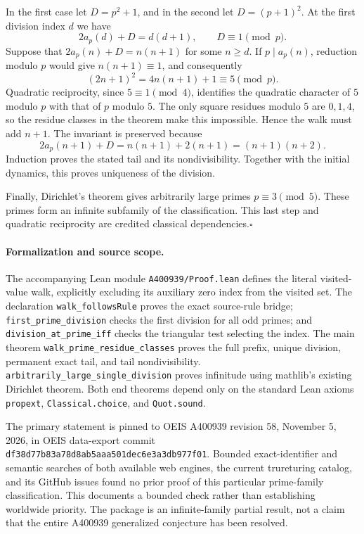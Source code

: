 In the first case let $D=p^2+1$, and in the second let $D=(p+1)^2$.
At the first division index $d$ we have
\[
 2a_p(d)+D=d(d+1),\qquad D\equiv1\pmod p.
\]
Suppose that $2a_p(n)+D=n(n+1)$ for some $n\ge d$. If
$p\mid a_p(n)$, reduction modulo $p$ would give $n(n+1)\equiv1$,
and consequently
\[
 (2n+1)^2=4n(n+1)+1\equiv5\pmod p.
\]
Quadratic reciprocity, since $5\equiv1\pmod4$, identifies the quadratic
character of $5$ modulo $p$ with that of $p$ modulo $5$. The only square
residues modulo $5$ are $0,1,4$, so the residue classes in the theorem
make this impossible. Hence the walk must add $n+1$. The invariant is
preserved because
\[
 2a_p(n+1)+D=n(n+1)+2(n+1)=(n+1)(n+2).
\]
Induction proves the stated tail and its nondivisibility. Together with
the initial dynamics, this proves uniqueness of the division.

Finally, Dirichlet's theorem gives arbitrarily large primes
$p\equiv3\pmod5$. These primes form an infinite subfamily of the
classification. This last step and quadratic reciprocity are credited
classical dependencies.\hfill$\square$

\paragraph{Formalization and source scope.}
The accompanying Lean module \texttt{A400939/Proof.lean} defines the
literal visited-value walk, explicitly excluding its auxiliary zero
index from the visited set. The declaration
\texttt{walk\_followsRule} proves the exact source-rule bridge;
\texttt{first\_prime\_division} checks the first division for all odd
primes; and \texttt{division\_at\_prime\_iff} checks the triangular test
selecting the index. The main theorem
\texttt{walk\_prime\_residue\_classes} proves the full prefix, unique
division, permanent exact tail, and tail nondivisibility.
\texttt{arbitrarily\_large\_single\_division} proves infinitude using
mathlib's existing Dirichlet theorem. Both end theorems depend only on
the standard Lean axioms \texttt{propext}, \texttt{Classical.choice},
and \texttt{Quot.sound}.

The primary statement is pinned to OEIS A400939 revision 58,
November 5, 2026, in OEIS data-export commit
\texttt{df38d77b83a78d8ab5aaa501dec6e3a3db977f01}.
Bounded exact-identifier and semantic searches of both available web
engines, the current trureturing catalog, and its GitHub issues found
no prior proof of this particular prime-family classification. This
documents a bounded check rather than establishing worldwide priority.
The package is an infinite-family partial result, not a claim that
the entire A400939 generalized conjecture has been resolved.
